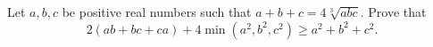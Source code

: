Let \(a,b,c\) be positive real numbers such that \(a+b+c=4\sqrt[3]{abc}\). Prove that \[2(ab+bc+ca)+4\min(a^2,b^2,c^2)\ge a^2+b^2+c^2.\]
